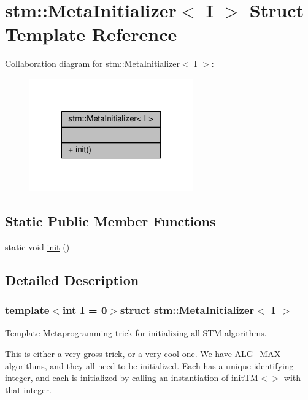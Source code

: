 \hypertarget{structstm_1_1MetaInitializer}{\section{stm\-:\-:Meta\-Initializer$<$ I $>$ Struct Template Reference}
\label{structstm_1_1MetaInitializer}
}


Collaboration diagram for stm\-:\-:Meta\-Initializer$<$ I $>$\-:
\nopagebreak
\begin{figure}[H]
\begin{center}
\leavevmode
\includegraphics[width=200pt]{structstm_1_1MetaInitializer__coll__graph}
\end{center}
\end{figure}
\subsection*{Static Public Member Functions}
\begin{DoxyCompactItemize}
\item 
static void \hyperlink{structstm_1_1MetaInitializer_aefc76265a7717e1161305fdcbae1231b}{init} ()
\end{DoxyCompactItemize}


\subsection{Detailed Description}
\subsubsection*{template$<$int I = 0$>$struct stm\-::\-Meta\-Initializer$<$ I $>$}

Template Metaprogramming trick for initializing all S\-T\-M algorithms.

This is either a very gross trick, or a very cool one. We have A\-L\-G\-\_\-\-M\-A\-X algorithms, and they all need to be initialized. Each has a unique identifying integer, and each is initialized by calling an instantiation of init\-T\-M$<$$>$ with that integer.

